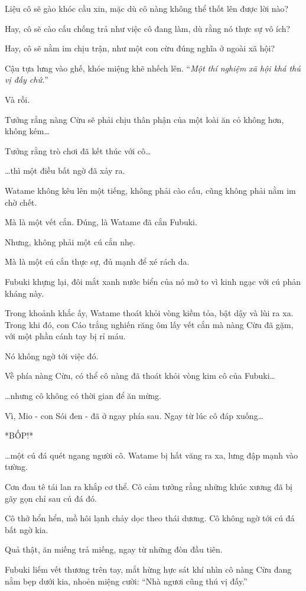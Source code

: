 \documentclass[../main.tex]{subfiles}
\begin{document}
Liệu cô sẽ gào khóc cầu xin, mặc dù cô nàng không thể thốt lên được lời nào?

Hay, cô sẽ cào cấu chống trả như việc cô đang làm, dù rằng nó thực sự vô ích?

Hay, cô sẽ nằm im chịu trận, như một con cừu đúng nghĩa ở ngoài xã hội?

Cậu tựa lưng vào ghế, khóe miệng khẽ nhếch lên. ``\textit{Một thí nghiệm xã hội khá thú vị đấy chứ.}''

Và rồi.

Tưởng rẳng nàng Cừu sẽ phải chịu thân phận của một loài ăn cỏ không hơn, không kém\dots

Tưởng rằng trò chơi đã kết thúc với cô\dots

\dots thì một điều bất ngờ đã xảy ra.

Watame không kêu lên một tiếng, không phải cào cấu, cũng không phải nằm im chờ chết.

Mà là một vết cắn. Đúng, là Watame đã cắn Fubuki.

Nhưng, không phải một cú cắn nhẹ.

Mà là một cú cắn thực sự, đủ mạnh để xé rách da.

Fubuki khựng lại, đôi mắt xanh nước biển của nó mở to vì kinh ngạc với cú phản kháng này.

Trong khoảnh khắc ấy, Watame thoát khỏi vòng kiềm tỏa, bật dậy và lùi ra xa. Trong khi đó, con Cáo trắng nghiến răng ôm lấy vết cắn mà nàng Cừu đã gặm, với một phần cánh tay bị rỉ máu.

Nó không ngờ tới việc đó.

Về phía nàng Cừu, có thể cô nàng đã thoát khỏi vòng kim cô của Fubuki\dots

\dots nhưng cô không có thời gian để ăn mừng.

Vì, Mio - con Sói đen - đã ở ngay phía sau. Ngay từ lúc cô đáp xuống\dots

*BỐP!*

\dots một cú đá quét ngang người cô. Watame bị hất văng ra xa, lưng đập mạnh vào tường.

Cơn đau tê tái lan ra khắp cơ thể. Cô cảm tưởng rằng những khúc xương đã bị gãy gọn chỉ sau cú đá đó.

Cô thở hổn hển, mồ hôi lạnh chảy dọc theo thái dương. Cô không ngờ tới cú đá bất ngờ kia.

Quả thật, ăn miếng trả miếng, ngay từ những đòn đầu tiên.

Fubuki liếm vết thương trên tay, mắt hừng hực sát khí nhìn cô nàng Cừu đang nằm bẹp dưới kia, nhoẻn miệng cười: ``Nhà ngươi cũng thú vị đấy.''
\end{document}
